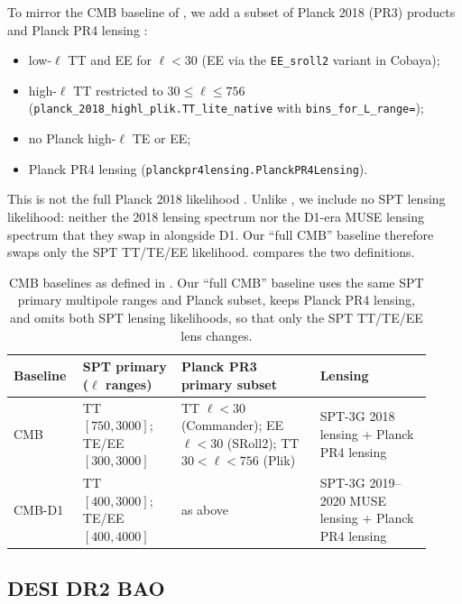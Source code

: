 \documentclass[11pt]{article}
\theoremstyle{remark}
\numberwithin{equation}{section}
\begin{document}
To mirror the CMB baseline of \cite{arxiv2601_16277}, we add a subset of Planck 2018 (PR3) products and Planck PR4 lensing \cite{planck2018_likelihood,planck_pr4_lensing,planck_pr4_lensing_maps}:
\begin{itemize}[leftmargin=*, itemsep=2pt]
  \item low-$\ell$ TT and EE for $\ell<30$ (EE via the \texttt{EE\_sroll2} variant in Cobaya);
  \item high-$\ell$ TT restricted to $30\le\ell\le756$ (\texttt{planck\_2018\_highl\_plik.\allowbreak TT\_lite\_native} with \texttt{bins\_for\_L\_range=\allowbreak[30,756]});
  \item no Planck high-$\ell$ TE or EE;
  \item Planck PR4 lensing (\texttt{planckpr4lensing.PlanckPR4Lensing}).
\end{itemize}
This is not the full Planck 2018 likelihood \cite{planck2018_cosmoparams}. Unlike \cite{arxiv2601_16277}, we include no SPT lensing likelihood: neither the 2018 lensing spectrum nor the D1-era MUSE lensing spectrum that they swap in alongside D1. Our ``full CMB'' baseline therefore swaps only the SPT TT/TE/EE likelihood.  compares the two definitions.

\begin{table}[t]
  \centering
  \caption{CMB baselines as defined in \cite{arxiv2601_16277}. Our ``full CMB'' baseline uses the same SPT primary multipole ranges and Planck subset, keeps Planck PR4 lensing, and omits both SPT lensing likelihoods, so that only the SPT TT/TE/EE lens changes.}
  \label{tab:baseline-defs}
  \small
  \begin{tabular}{@{} p{0.14\linewidth} p{0.22\linewidth} p{0.31\linewidth} p{0.25\linewidth} @{}}
\toprule
Baseline & SPT primary ($\ell$ ranges) & Planck PR3 primary subset & Lensing \\
\midrule
CMB & TT $[750,3000]$; TE/EE $[300,3000]$ & TT $\ell<30$ (Commander); EE $\ell<30$ (SRoll2); TT $30<\ell<756$ (Plik) & SPT-3G 2018 lensing + Planck PR4 lensing \\
\addlinespace
CMB-D1 & TT $[400,3000]$; TE/EE $[400,4000]$ & as above & SPT-3G 2019--2020 MUSE lensing + Planck PR4 lensing \\
\bottomrule
\end{tabular}
 \end{table}

\subsection{DESI DR2 BAO}
\label{sec:desi-bao}
\end{document}
